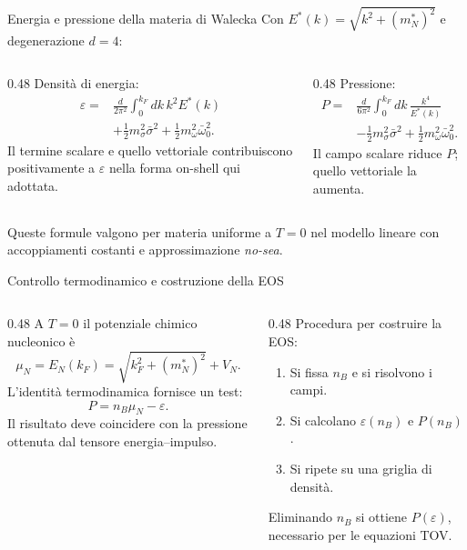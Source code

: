 \begin{frame}{Energia e pressione della materia di Walecka}
\small
Con $E^*(k)=\sqrt{k^2+(m_N^*)^2}$ e degenerazione $d=4$:
\begin{columns}[T,onlytextwidth]
\begin{column}{0.48\textwidth}
Densità di energia:
\[
 \begin{aligned}
 \varepsilon={}&\frac{d}{2\pi^2}\int_0^{k_F}
 dk\,k^2E^*(k)\\
 &+\frac12m_\sigma^2\bar\sigma^2
 +\frac12m_\omega^2\bar\omega_0^2.
 \end{aligned}
\]
Il termine scalare e quello vettoriale contribuiscono positivamente a $\varepsilon$ nella forma on-shell qui adottata.
\end{column}
\begin{column}{0.48\textwidth}
Pressione:
\[
 \begin{aligned}
 P={}&\frac{d}{6\pi^2}\int_0^{k_F}
 dk\,\frac{k^4}{E^*(k)}\\
 &-\frac12m_\sigma^2\bar\sigma^2
 +\frac12m_\omega^2\bar\omega_0^2.
 \end{aligned}
\]
Il campo scalare riduce $P$; quello vettoriale la aumenta.
\end{column}
\end{columns}
\medskip
Queste formule valgono per materia uniforme a $T=0$ nel modello lineare con accoppiamenti costanti e approssimazione \emph{no-sea}.
\end{frame}

\begin{frame}{Controllo termodinamico e costruzione della EOS}
\small
\begin{columns}[T,onlytextwidth]
\begin{column}{0.48\textwidth}
A $T=0$ il potenziale chimico nucleonico è
\[
 \mu_N=E_N(k_F)
 =\sqrt{k_F^2+(m_N^*)^2}+V_N.
\]
L'identità termodinamica fornisce un test:
\[
 P=n_B\mu_N-\varepsilon.
\]
Il risultato deve coincidere con la pressione ottenuta dal tensore energia--impulso.
\end{column}
\begin{column}{0.48\textwidth}
Procedura per costruire la EOS:
\begin{enumerate}
\item Si fissa $n_B$ e si risolvono i campi.
\item Si calcolano $\varepsilon(n_B)$ e $P(n_B)$.
\item Si ripete su una griglia di densità.
\end{enumerate}
Eliminando $n_B$ si ottiene $P(\varepsilon)$, necessario per le equazioni TOV.
\end{column}
\end{columns}
\end{frame}

